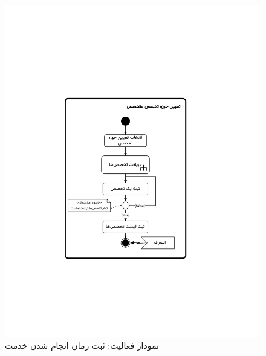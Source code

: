\begin{figure}[ht!]
	\centering
	\includegraphics[scale=0.8, page=4]{figs/OOD-activity21-30.pdf}
	\caption{نمودار فعالیت: ثبت زمان انجام شدن خدمت}
\end{figure}
\FloatBarrier
\newpage

